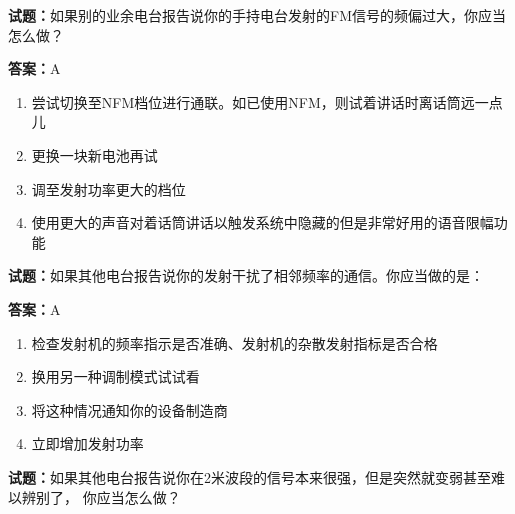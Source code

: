 \documentclass{ctexbook}
\begin{document}




\vspace{1em}

\textbf{试题：}如果别的业余电台报告说你的手持电台发射的FM信号的频偏过大，你应当怎么做？ 

\textbf{答案：}A 

\begin{enumerate}[leftmargin=3em]
  \item 尝试切换至NFM档位进行通联。如已使用NFM，则试着讲话时离话筒远一点儿 

  \item 更换一块新电池再试 

  \item 调至发射功率更大的档位 

  \item 使用更大的声音对着话筒讲话以触发系统中隐藏的但是非常好用的语音限幅功能 

\end{enumerate}





\vspace{1em}

\textbf{试题：}如果其他电台报告说你的发射干扰了相邻频率的通信。你应当做的是： 

\textbf{答案：}A 

\begin{enumerate}[leftmargin=3em]
  \item 检查发射机的频率指示是否准确、发射机的杂散发射指标是否合格 

  \item 换用另一种调制模式试试看 

  \item 将这种情况通知你的设备制造商 

  \item 立即增加发射功率 

\end{enumerate}





\vspace{1em}

\textbf{试题：}如果其他电台报告说你在2米波段的信号本来很强，但是突然就变弱甚至难以辨别了，
你应当怎么做？ 
\end{document}
